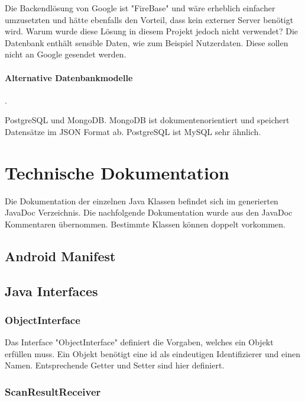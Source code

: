 \documentclass{scrartcl}
\begin{document}
\noindent Die Backendlösung von Google ist "FireBase" und wäre erheblich einfacher umzusetzten und hätte ebenfalls den Vorteil, dass kein externer Server benötigt wird. Warum wurde diese Lösung in diesem Projekt jedoch nicht verwendet? Die Datenbank enthält sensible Daten, wie zum Beispiel Nutzerdaten. Diese sollen nicht an Google gesendet werden.

\paragraph{Alternative Datenbankmodelle}.\newline

\noindent PostgreSQL und MongoDB. MongoDB ist dokumentenorientiert und speichert Datensätze im JSON Format ab. PostgreSQL ist MySQL sehr ähnlich.

\newpage

\section{Technische Dokumentation}

Die Dokumentation der einzelnen Java Klassen befindet sich im generierten JavaDoc Verzeichnis. Die nachfolgende Dokumentation wurde aus den JavaDoc Kommentaren übernommen. Bestimmte Klassen können doppelt vorkommen.

\subsection{Android Manifest}

\subsection{Java Interfaces}

\subsubsection{ObjectInterface}

Das Interface "ObjectInterface" definiert die Vorgaben, welches ein Objekt erfüllen muss. Ein Objekt benötigt eine id als eindeutigen Identifizierer und einen Namen. Entsprechende Getter und Setter sind hier definiert.

\subsubsection{ScanResultReceiver}
\end{document}
